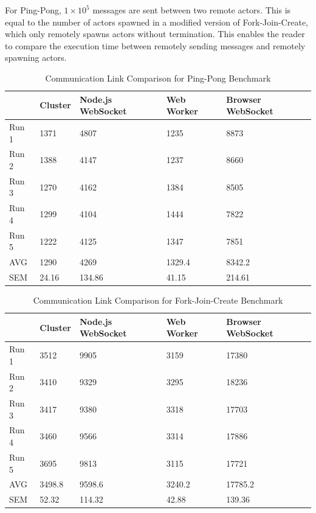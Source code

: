 \documentclass[oneside]{um-fict}
\begin{document}
For Ping-Pong, $1\times10^5$ messages are sent between two remote actors. This is equal to the number of actors spawned in a modified version of Fork-Join-Create, which only remotely spawns actors without termination. This enables the reader to compare the execution time between remotely sending messages and remotely spawning actors.
\begin{table}[H]
    \begin{center}
        \begin{tabular}{|l|llll|}
        \hline
        & Cluster & Node.js WebSocket & Web Worker & Browser WebSocket \\ \hline
        Run 1 & 1371    & 4807              & 1235       & 8873              \\
        Run 2 & 1388    & 4147              & 1237       & 8660              \\
        Run 3 & 1270    & 4162              & 1384       & 8505              \\
        Run 4 & 1299    & 4104              & 1444       & 7822              \\
        Run 5 & 1222    & 4125              & 1347       & 7851              \\ \hline
        AVG   & 1290    & 4269              & 1329.4     & 8342.2            \\
        SEM   & 24.16   & 134.86            & 41.15      & 214.61            \\ \hline
        \end{tabular}
        \caption{Communication Link Comparison for Ping-Pong Benchmark}\label{tab:pingpongcomms}
    \end{center}
\end{table}
\begin{table}[H]
    \begin{center}
        \begin{tabular}{|l|llll|}
        \hline
        & Cluster & Node.js WebSocket & Web Worker & Browser WebSocket \\ \hline
        Run 1 & 3512    & 9905              & 3159       & 17380             \\
        Run 2 & 3410    & 9329              & 3295       & 18236             \\
        Run 3 & 3417    & 9380              & 3318       & 17703             \\
        Run 4 & 3460    & 9566              & 3314       & 17886             \\
        Run 5 & 3695    & 9813              & 3115       & 17721             \\ \hline
        AVG   & 3498.8  & 9598.6            & 3240.2     & 17785.2           \\
        SEM   & 52.32   & 114.32            & 42.88      & 139.36            \\ \hline
        \end{tabular}
        \caption{Communication Link Comparison for Fork-Join-Create Benchmark}\label{tab:fjcreatecomms}
    \end{center}
\end{table}
\end{document}
